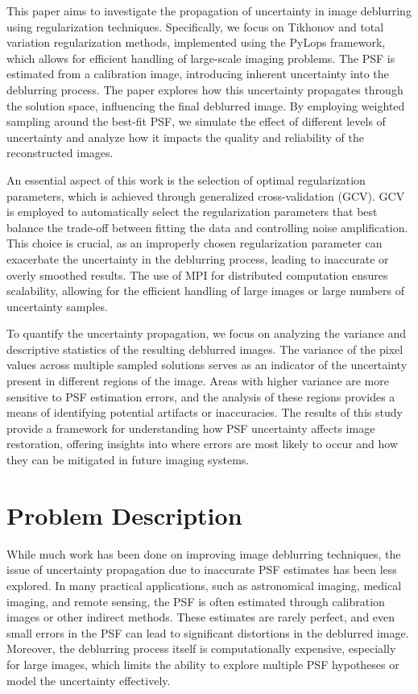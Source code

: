 \documentclass[letterpaper, 10pt, titlepage, twocolumn]{article}
\begin{document}
This paper aims to investigate the propagation of uncertainty in image deblurring using regularization techniques. Specifically, we focus on Tikhonov and total variation regularization methods, implemented using the PyLops framework, which allows for efficient handling of large-scale imaging problems. The PSF is estimated from a calibration image, introducing inherent uncertainty into the deblurring process. The paper explores how this uncertainty propagates through the solution space, influencing the final deblurred image. By employing weighted sampling around the best-fit PSF, we simulate the effect of different levels of uncertainty and analyze how it impacts the quality and reliability of the reconstructed images.

An essential aspect of this work is the selection of optimal regularization parameters, which is achieved through generalized cross-validation (GCV). GCV is employed to automatically select the regularization parameters that best balance the trade-off between fitting the data and controlling noise amplification. This choice is crucial, as an improperly chosen regularization parameter can exacerbate the uncertainty in the deblurring process, leading to inaccurate or overly smoothed results. The use of MPI for distributed computation ensures scalability, allowing for the efficient handling of large images or large numbers of uncertainty samples.

To quantify the uncertainty propagation, we focus on analyzing the variance and descriptive statistics of the resulting deblurred images. The variance of the pixel values across multiple sampled solutions serves as an indicator of the uncertainty present in different regions of the image. Areas with higher variance are more sensitive to PSF estimation errors, and the analysis of these regions provides a means of identifying potential artifacts or inaccuracies. The results of this study provide a framework for understanding how PSF uncertainty affects image restoration, offering insights into where errors are most likely to occur and how they can be mitigated in future imaging systems.

\section*{Problem Description}
While much work has been done on improving image deblurring techniques, the issue of uncertainty propagation due to inaccurate PSF estimates has been less explored. In many practical applications, such as astronomical imaging, medical imaging, and remote sensing, the PSF is often estimated through calibration images or other indirect methods. These estimates are rarely perfect, and even small errors in the PSF can lead to significant distortions in the deblurred image. Moreover, the deblurring process itself is computationally expensive, especially for large images, which limits the ability to explore multiple PSF hypotheses or model the uncertainty effectively.
\end{document}
